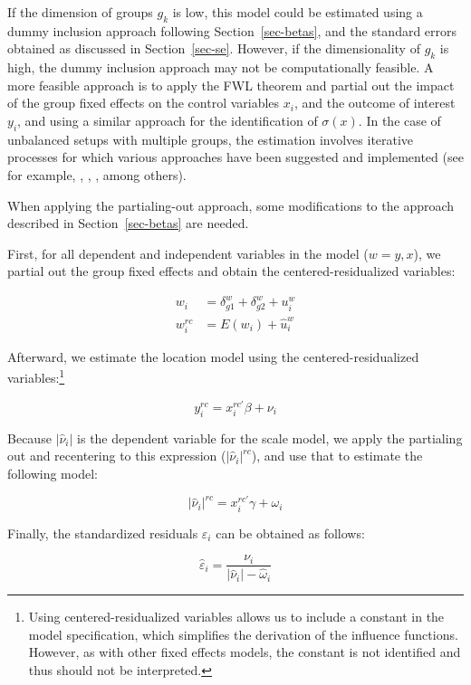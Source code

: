 \documentclass[
  authoryear,
  review,
  1p]{elsarticle}
\begin{document}
If the dimension of groups \(g_k\) is low, this model could be estimated
using a dummy inclusion approach following Section~\ref{sec-betas}, and
the standard errors obtained as discussed in Section~\ref{sec-se}.
However, if the dimensionality of \(g_k\) is high, the dummy inclusion
approach may not be computationally feasible. A more feasible approach
is to apply the FWL theorem and partial out the impact of the group
fixed effects on the control variables \(x_{i}\), and the outcome of
interest \(y_{i}\), and using a similar approach for the identification
of \(\sigma(x)\). In the case of unbalanced setups with multiple groups,
the estimation involves iterative processes for which various approaches
have been suggested and implemented (see for example,
\citet{correia_feasible_nodate}, \citet{gaure2013}, \citet{rios2015},
among others).

When applying the partialing-out approach, some modifications to the
approach described in Section~\ref{sec-betas} are needed.

First, for all dependent and independent variables in the model
(\(w=y,x\)), we partial out the group fixed effects and obtain the
centered-residualized variables:

\[\begin{aligned}
w_{i} &= \delta_{g1}^w + \delta_{g2}^w + u_{i}^w \\
w_{i}^{rc} &= E(w_{i}) + \hat{u}_{i}^w
\end{aligned}
\]

Afterward, we estimate the location model using the
centered-residualized variables:\footnote{Using centered-residualized
  variables allows us to include a constant in the model specification,
  which simplifies the derivation of the influence functions. However,
  as with other fixed effects models, the constant is not identified and
  thus should not be interpreted.}

\[y_{i}^{rc} = x_{i}^{rc'} \beta + \nu_{i}
\]

Because \(|\hat \nu_i|\) is the dependent variable for the scale model,
we apply the partialing out and recentering to this expression
(\(|\hat \nu_i|^{rc}\)), and use that to estimate the following model:

\[|\hat\nu_{i}|^{rc} = x_{i}^{rc'} \gamma + \omega_{i}\]

Finally, the standardized residuals \(\varepsilon_i\) can be obtained as
follows:

\[\hat{\varepsilon}_{i} = \frac{\nu_{i}}{|\hat\nu_{i}|- \hat \omega_{i}}\]
\end{document}
